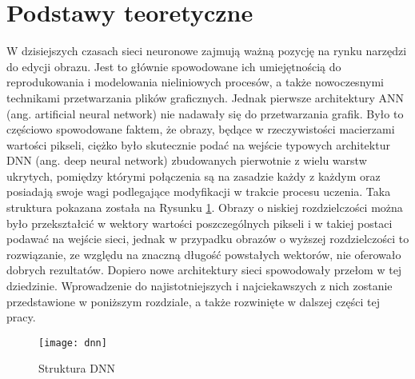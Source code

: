 \section[Podstawy teoretyczne (Piotr Winkler)]{Podstawy teoretyczne}

  W dzisiejszych czasach sieci neuronowe zajmują ważną pozycję na rynku narzędzi
  do edycji obrazu. Jest to głównie spowodowane ich umiejętnością do
  reprodukowania i modelowania nieliniowych procesów, a także nowoczesnymi
  technikami przetwarzania plików graficznych.
  Jednak pierwsze architektury ANN (ang. artificial neural network) nie nadawały
  się do przetwarzania grafik.
  Było to częściowo spowodowane faktem, że obrazy, będące w rzeczywistości macierzami
  wartości pikseli,
  ciężko było skutecznie podać
  na wejście typowych architektur DNN (ang. deep neural network) zbudowanych
  pierwotnie z wielu warstw ukrytych, pomiędzy którymi połączenia są na zasadzie
  każdy z każdym oraz posiadają swoje wagi podlegające modyfikacji w trakcie procesu
  uczenia. Taka struktura pokazana została na Rysunku \ref{fig:dnn}.
  Obrazy o niskiej rozdzielczości można było przekształcić w wektory
  wartości poszczególnych pikseli i w takiej postaci podawać na wejście sieci,
  jednak w przypadku obrazów o wyższej rozdzielczości to rozwiązanie, ze
  względu na znaczną długość powstałych wektorów, nie oferowało dobrych
  rezultatów.
  Dopiero nowe architektury sieci spowodowały przełom w tej dziedzinie.
  Wprowadzenie do najistotniejszych i najciekawszych z nich zostanie przedstawione w
  poniższym rozdziale, a także rozwinięte w dalszej części tej pracy.


  \begin{figure}[h]
    \centering
    \texttt{[image: dnn]}
    \caption[Struktura DNN - źródło: \url{https://towardsdatascience.com/building-a-convolutional-neural-network-male-vs-female-50347e2fa88b}]{Struktura DNN}
    \label{fig:dnn}
  \end{figure}


